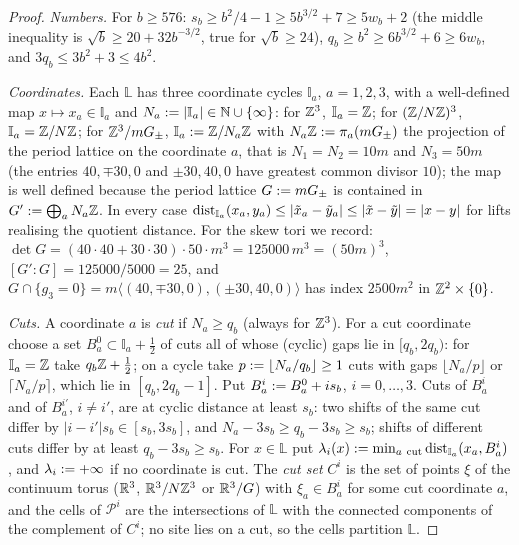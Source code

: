 \begin{proof}
\emph{Numbers.} For $b\ge576$: $s_b\ge b^2/4-1\ge5b^{3/2}+7\ge5w_b+2$ (the middle inequality is $\sqrt b\ge20+32b^{-3/2}$, true for $\sqrt b\ge24$), $q_b\ge b^2\ge6b^{3/2}+6\ge6w_b$, and $3q_b\le3b^2+3\le4b^2$.

\emph{Coordinates.} Each $\mathbb{L}$ has three coordinate cycles $\mathbb I_a$, $a=1,2,3$, with a well-defined map $x\mapsto x_a\in\mathbb I_a$ and $N_a:=|\mathbb I_a|\in\mathbb N\cup\{\infty\}$: for $\mathbb Z^3$, $\mathbb I_a=\mathbb Z$; for $(\mathbb Z/N\mathbb Z)^3$, $\mathbb I_a=\mathbb Z/N\mathbb Z$; for $\mathbb Z^3/mG_\pm$, $\mathbb I_a:=\mathbb Z/N_a\mathbb Z$ with $N_a\mathbb Z:=\pi_a(mG_\pm)$ the projection of the period lattice on the coordinate $a$, that is $N_1=N_2=10m$ and $N_3=50m$ (the entries $40,\mp30,0$ and $\pm30,40,0$ have greatest common divisor $10$); the map is well defined because the period lattice $G:= mG_\pm$ is contained in $G':=\bigoplus_aN_a\mathbb Z$. In every case $\operatorname{dist}_{\mathbb I_a}(x_a,y_a)\le|\tilde x_a-\tilde y_a|\le|\tilde x-\tilde y|=|x-y|$ for lifts realising the quotient distance. For the skew tori we record: $\det G=(40\cdot40+30\cdot30)\cdot50\cdot m^3=125000\,m^3=(50m)^3$, $[G':G]=125000/5000=25$, and $G\cap\{g_3=0\}=m\langle(40,\mp30,0),(\pm30,40,0)\rangle$ has index $2500m^2$ in $\mathbb Z^2\times\{0\}$.

\emph{Cuts.} A coordinate $a$ is \emph{cut} if $N_a\ge q_b$ (always for $\mathbb Z^3$). For a cut coordinate choose a set $B^0_a\subset\mathbb I_a+\frac12$ of cuts all of whose (cyclic) gaps lie in $[q_b,2q_b)$: for $\mathbb I_a=\mathbb Z$ take $q_b\mathbb Z+\frac12$; on a cycle take $p:=\lfloor N_a/q_b\rfloor\ge1$ cuts with gaps $\lfloor N_a/p\rfloor$ or $\lceil N_a/p\rceil$, which lie in $[q_b,2q_b-1]$. Put $B^i_a:= B^0_a+is_b$, $i=0,\dots,3$. Cuts of $B^i_a$ and of $B^{i'}_a$, $i\ne i'$, are at cyclic distance at least $s_b$: two shifts of the same cut differ by $|i-i'|s_b\in[s_b,3s_b]$, and $N_a-3s_b\ge q_b-3s_b\ge s_b$; shifts of different cuts differ by at least $q_b-3s_b\ge s_b$. For $x\in\mathbb{L}$ put $\lambda_i(x)\defeq\min_{a\ \mathrm{cut}}\dist_{\mathbb I_a}(x_a,B^i_a)$, and $\lambda_i:=+\infty$ if no coordinate is cut. The \emph{cut set} $C^i$ is the set of points $\xi$ of the continuum torus ($\mathbb R^3$, $\mathbb R^3/N\mathbb Z^3$ or $\mathbb R^3/G$) with $\xi_a\in B^i_a$ for some cut coordinate $a$, and the cells of $\mathcal P^i$ are the intersections of $\mathbb{L}$ with the connected components of the complement of $C^i$; no site lies on a cut, so the cells partition $\mathbb{L}$.


\end{proof}
